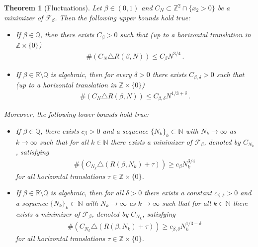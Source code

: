 \documentclass[reqno]{amsart}
\theoremstyle{plain}
\newtheorem{theorem}{Theorem}[section]
\theoremstyle{definition}
\numberwithin{equation}{section}
\newcommand{\Z}{\mathbb{Z}}
\begin{document}
\begin{theorem}[Fluctuations]\label{thm:fluctuation}
 Let $\beta \in  (0,1)  $ and $C_N  \subset \Z^2 \cap \{x_2>0\}$
   be a minimizer of $\mathcal{F}_\beta$. Then the following upper bounds  hold true:
\begin{itemize}
\item[{\rm ($U_1$)}] If $\beta \in \mathbb{Q}$, then there exists $C_\beta>0$ such that (up to a horizontal translation  in $\mathbb{Z} \times \{0\}$) 
\begin{align*}
\#\left(C_N   \triangle  R(\beta,N)  \right) \leq C_\beta
  N^{3/4}\,.
\end{align*}
\item[{\rm ($U_2$)}] If $\beta \in \mathbb{R}\setminus \mathbb{Q}$ is algebraic, then for every $ \delta >0$ there exists $C_{\beta, \delta }>0$ such that  (up to a horizontal translation in $\mathbb{Z} \times \{0\}$) 
\begin{align*}
\#\left(C_N  \triangle   R(\beta,N)  \right) \leq C_{\beta, \delta } N^{1/3+ \delta }\,.
\end{align*}
\end{itemize}
Moreover,  the following lower  bounds hold true:
\begin{itemize}
\item[{\rm ($L_1$)}] If $\beta \in \mathbb{Q}$,  there exists
  $c_\beta>0$ and a sequence $\{ N_k \}_k \subset \mathbb{N}$ with
  $N_k \to \infty$ as $k \to \infty$ such that  for all $k \in
  \mathbb{N}$ there exists  a minimizer of $\mathcal{F}_\beta$,
  denoted by $C_{N_k}$, %
  satisfying    
\begin{align*}
\#\left(C_{N_k}  \triangle \left(R(\beta,N_k) +\tau\right)\right) \geq c_\beta N_k^{3/4}\,
\end{align*}
 for all horizontal translations $\tau \in \mathbb{Z} \times \{0\}$. 
\item[{\rm ($L_2$)}] If $\beta \in \mathbb{R}\setminus \mathbb{Q}$ is
  algebraic, then for all $ \delta >0$ there exists a constant
  $c_{\beta, \delta }>0$ and a sequence $\{  N_k \}_k \subset
  \mathbb{N}$ with $N_k \to \infty$ as $k \to \infty$ such that  for
  all $k \in \mathbb{N}$ there exists  a minimizer of
  $\mathcal{F}_\beta$, denoted by $C_{N_k}$, %
  satisfying    
\begin{align*}
\#\left(C_{N_k}  \triangle \left(R(\beta,N_k) +\tau\right)\right) \geq c_{\beta, \delta } N_k^{1/3- \delta }\,
\end{align*}
 for all horizontal translations $\tau \in \mathbb{Z} \times \{0\}$.
\end{itemize}
\end{theorem}
\end{document}
